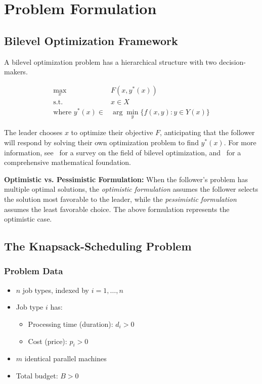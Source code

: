 \chapter{Problem Formulation}
\label{sec:formulation}


\section{Bilevel Optimization Framework}

A bilevel optimization problem has a hierarchical structure with two decision-makers.
\begin{definition}
\label{def:bilevel}
\begin{align}
\max_{x} \quad & F(x, y^*(x)) \label{eq:bilevel-upper}\\
\text{s.t.} \quad & x \in X \nonumber\\
\text{where } y^*(x) \in & \arg\min_{y} \{f(x, y) : y \in Y(x)\} \label{eq:bilevel-lower}
\end{align}
\end{definition}

The leader chooses $x$ to optimize their objective $F$, anticipating that the follower will respond by solving their own optimization problem to find $y^*(x)$.  For more information, see~\cite{kleinert2021survey} for a survey on the field of bilevel optimization, and~\cite{dempe2020bilevel} for a comprehensive mathematical foundation.

\textbf{Optimistic vs. Pessimistic Formulation:} When the follower's problem has multiple optimal solutions, 
the \emph{optimistic formulation} assumes the follower selects the solution most favorable to the leader, 
while the \emph{pessimistic formulation} assumes the least favorable choice. The above formulation represents the optimistic case.
\section{The Knapsack-Scheduling Problem}

\subsection{Problem Data}

\begin{itemize}
    \item $n$ job types, indexed by $i = 1, \ldots, n$
    \item Job type $i$ has:
    \begin{itemize}
        \item Processing time (duration): $d_i > 0$
        \item Cost (price): $p_i > 0$
    \end{itemize}
    \item $m$ identical parallel machines
    \item Total budget: $B > 0$
\end{itemize}

